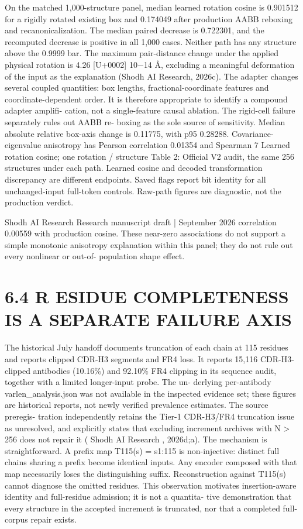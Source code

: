 \documentclass[11pt]{article}
\begin{document}
On the matched 1,000-structure panel, median learned rotation cosine is 0.901512 for a rigidly
rotated existing box and 0.174049 after production AABB reboxing and recanonicalization. The
median paired decrease is 0.722301, and the recomputed decrease is positive in all 1,000 cases.
Neither path has any structure above the 0.9999 bar. The maximum pair-distance change under the
applied physical rotation is 4.26 [U+0002] 10\ensuremath{-}14 Å, excluding a meaningful deformation of the input as the
explanation (Shodh AI Research, 2026c).
The adapter changes several coupled quantities: box lengths, fractional-coordinate features and
coordinate-dependent order. It is therefore appropriate to identify a compound adapter amplifi-
cation, not a single-feature causal ablation. The rigid-cell failure separately rules out AABB re-
boxing as the sole source of sensitivity. Median absolute relative box-axis change is 0.11775, with
p95 0.28288. Covariance-eigenvalue anisotropy has Pearson correlation 0.01354 and Spearman
7
Learned rotation cosine; one rotation / structure
Table 2: Official V2 audit, the same 256 structures under each path. Learned cosine and decoded
transformation discrepancy are different endpoints. Saved flags report bit identity for all
unchanged-input full-token controls. Raw-path figures are diagnostic, not the production verdict.

Shodh AI Research Research manuscript draft | September 2026
correlation 0.00559 with production cosine. These near-zero associations do not support a simple
monotonic anisotropy explanation within this panel; they do not rule out every nonlinear or out-of-
population shape effect.

\section*{6.4 R ESIDUE COMPLETENESS IS A SEPARATE FAILURE AXIS}

The historical July handoff documents truncation of each chain at 115 residues and reports clipped
CDR-H3 segments and FR4 loss. It reports 15,116 CDR-H3-clipped antibodies (10.16\%) and
92.10\% FR4 clipping in its sequence audit, together with a limited longer-input probe. The un-
derlying per-antibody varlen\_analysis.json was not available in the inspected evidence set;
these figures are historical reports, not newly verified prevalence estimates. The source preregis-
tration independently retains the Tier-1 CDR-H3/FR4 truncation issue as unresolved, and explicitly
states that excluding increment archives with N > 256 does not repair it ( Shodh AI Research ,
2026d;a).
The mechanism is straightforward. A prefix map T115(s) = s1:115 is non-injective: distinct full
chains sharing a prefix become identical inputs. Any encoder composed with that map necessarily
loses the distinguishing suffix. Reconstruction against T115(s) cannot diagnose the omitted residues.
This observation motivates insertion-aware identity and full-residue admission; it is not a quantita-
tive demonstration that every structure in the accepted increment is truncated, nor that a completed
full-corpus repair exists.
\end{document}
